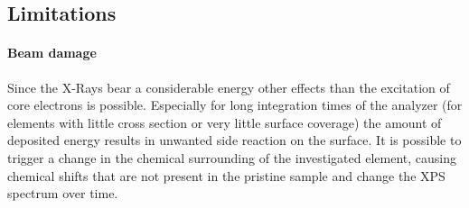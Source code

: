 %	
%	
%	
%	
\subsection{Limitations}
\paragraph{Beam damage}
Since the X-Rays bear a considerable energy other effects than the excitation of core electrons is possible. Especially for long integration times of the analyzer (for elements with little cross section or very little surface coverage) the amount of deposited energy results in unwanted side reaction on the surface. It is possible to trigger a change in the chemical surrounding of the investigated element, causing chemical shifts that are not present in the pristine sample and change the XPS spectrum over time.

